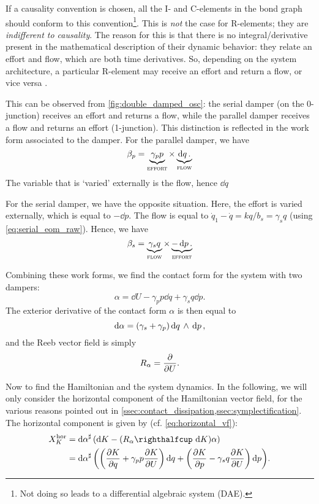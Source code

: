 If a causality convention is chosen, all the I- and C-elements in the bond graph should conform to this convention\footnote{Not doing so leads to a differential algebraic system (DAE).}. This is \emph{not} the case for R-elements; they are \emph{indifferent to causality}. The reason for this is that there is no integral/derivative present in the mathematical description of their dynamic behavior: they relate an effort and flow, which are both time derivatives. So, depending on the system architecture, a particular R-element may receive an effort and return a flow, or vice versa \cite{Borutzky2010}.

This can be observed from \cref{fig:double_damped_osc}: the serial damper (on the 0-junction) receives an effort and returns a flow, while the parallel damper receives a flow and returns an effort (1-junction). This distinction is reflected in the work form associated to the damper. For the parallel damper, we have
$$ \beta_p = \underbrace{\gamma_p p}_\text{\textsc{effort}} \times \underbrace{\dd{q}.}_\text{\textsc{flow}} $$
The variable that is `varied' externally is the flow, hence $\dd{q}$ 

For the serial damper, we have the opposite situation. Here, the effort is varied externally, which is equal to $-\dd{p}$. The flow is equal to $\dot{q}_1 - \dot{q} = kq/b_s = \gamma_s q$ (using \cref{eq:serial_eom_raw}). Hence, we have
$$ \beta_s = \underbrace{\gamma_s q}_\text{\textsc{flow}} \times \underbrace{-\dd{p}.}_\text{\textsc{effort}}$$

Combining these work forms, we find the contact form for the system with two dampers:
\begin{equation}
    \alpha = \dd{U} - \gamma_p p\dd{q} + \gamma_s q \dd{p}.
    \label{eq:serial_dho_contact_form}
\end{equation}
The exterior derivative of the contact form $\alpha$ is then equal to
$$ \dd{\alpha} = (\gamma_s + \gamma_p)  \dd{q}\,\wedge\,\dd{p} , $$
and the Reeb vector field is simply
$$ R_\alpha = \pdv{}{U}. $$

Now to find the Hamiltonian and the system dynamics. In the following, we will only consider the horizontal component of the Hamiltonian vector field, for the various reasons pointed out in \cref{ssec:contact_dissipation,ssec:symplectification}. The horizontal component is given by (cf. \cref{eq:horizontal_vf}):
\begin{equation}
    \begin{split}
        X^\text{hor}_K &= \fromDual{\dd{\alpha}}\qty(\dd{K} - (\intpr{R_\alpha}{\dd{K}})\alpha) \\
                       &= \fromDual{\dd{\alpha}}\qty(\qty(\pdv{K}{q} + \gamma_p p \pdv{K}{U})\dd{q} + \qty(\pdv{K}{p} - \gamma_s q \pdv{K}{U})\dd{p}).
    \end{split}
\end{equation}

